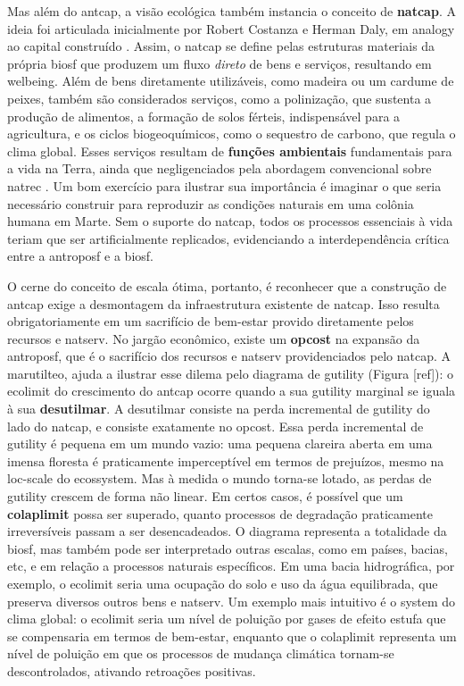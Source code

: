 \documentclass[./main.tex]{subfiles}
\begin{document}
\par Mas além do \gls{antcap}, a visão ecológica também instancia o conceito de \textbf{\gls{natcap}}. A ideia foi articulada inicialmente por Robert Costanza e Herman Daly, em \gls{analogy} ao capital construído \cite{Costanza1992a}. Assim, o \gls{natcap} se define pelas estruturas materiais da própria \gls{biosf} que produzem um fluxo \textit{direto} de bens e serviços, resultando em \gls{welbeing}. Além de bens diretamente utilizáveis, como madeira ou um cardume de peixes, também são considerados serviços, como a polinização, que sustenta a produção de alimentos, a formação de solos férteis, indispensável para a agricultura, e os ciclos biogeoquímicos, como o sequestro de carbono, que regula o clima global. Esses serviços resultam de \textbf{funções ambientais} fundamentais para a vida na Terra, ainda que negligenciados pela abordagem convencional sobre \gls{natrec} \cite{Groot1987a}. Um bom exercício para ilustrar sua importância é imaginar o que seria necessário construir para reproduzir as condições naturais em uma colônia humana em Marte. Sem o suporte do \gls{natcap}, todos os processos essenciais à vida teriam que ser artificialmente replicados, evidenciando a interdependência crítica entre a \gls{antroposf} e a \gls{biosf}.

\par O cerne do conceito de escala ótima, portanto, é reconhecer que a construção de \gls{antcap} exige a desmontagem da infraestrutura existente de \gls{natcap}. Isso resulta obrigatoriamente em um sacrifício de bem-estar provido diretamente pelos recursos e \gls{natserv}. No jargão econômico, existe um \textbf{\gls{opcost}} na expansão da \gls{antroposf}, que é o sacrifício dos recursos e \gls{natserv} providenciados pelo \gls{natcap}. A \gls{marutilteo}, ajuda a ilustrar esse dilema pelo diagrama de \gls{gutility} (Figura [ref]): o \gls{ecolimit} do crescimento do \gls{antcap} ocorre quando a sua \gls{gutility} marginal se iguala à sua \textbf{\gls{desutilmar}}. A \gls{desutilmar} consiste na perda incremental de \gls{gutility} do lado do \gls{natcap}, e consiste exatamente no \gls{opcost}. Essa perda incremental de \gls{gutility} é pequena em um mundo vazio: uma pequena clareira aberta em uma imensa floresta é praticamente imperceptível em termos de prejuízos, mesmo na \gls{loc-scale} do ecos\gls{system}. Mas à medida o mundo torna-se lotado, as perdas de \gls{gutility} crescem de forma não linear. Em certos casos, é possível que um \textbf{\gls{colaplimit}} possa ser superado, quanto processos de degradação praticamente irreversíveis passam a ser desencadeados. O diagrama representa a totalidade da \gls{biosf}, mas também pode ser interpretado outras escalas, como em países, bacias, etc, e em relação a processos naturais específicos. Em uma bacia hidrográfica, por exemplo, o \gls{ecolimit} seria uma ocupação do solo e uso da água equilibrada, que preserva diversos outros bens e \gls{natserv}. Um exemplo mais intuitivo é o \gls{system} do clima global: o \gls{ecolimit} seria um nível de poluição por gases de efeito estufa que se compensaria em termos de bem-estar, enquanto que o \gls{colaplimit} representa um nível de poluição em que os processos de mudança climática tornam-se descontrolados, ativando retroações positivas. 
\end{document}
